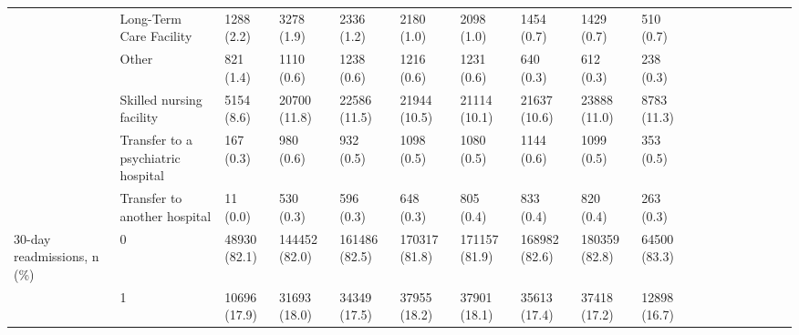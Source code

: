 \begin{tabular}{llllllllllllllllll}
                                       & Long-Term Care Facility &                   1288 (2.2) &      3278 (1.9) &      2336 (1.2) &      2180 (1.0) &      2098 (1.0) &      1454 (0.7) &      1429 (0.7) &      510 (0.7) &                   &                    &                    &                    &                    &                     &                     &                     \\
                                       & Other &                    821 (1.4) &      1110 (0.6) &      1238 (0.6) &      1216 (0.6) &      1231 (0.6) &       640 (0.3) &       612 (0.3) &      238 (0.3) &                   &                    &                    &                    &                    &                     &                     &                     \\
                                       & Skilled nursing facility &                   5154 (8.6) &    20700 (11.8) &    22586 (11.5) &    21944 (10.5) &    21114 (10.1) &    21637 (10.6) &    23888 (11.0) &    8783 (11.3) &                   &                    &                    &                    &                    &                     &                     &                     \\
                                       & Transfer to a psychiatric hospital &                    167 (0.3) &       980 (0.6) &       932 (0.5) &      1098 (0.5) &      1080 (0.5) &      1144 (0.6) &      1099 (0.5) &      353 (0.5) &                   &                    &                    &                    &                    &                     &                     &                     \\
                                       & Transfer to another hospital &                     11 (0.0) &       530 (0.3) &       596 (0.3) &       648 (0.3) &       805 (0.4) &       833 (0.4) &       820 (0.4) &      263 (0.3) &                   &                    &                    &                    &                    &                     &                     &                     \\
30-day readmissions, n (\%) & 0 &                 48930 (82.1) &   144452 (82.0) &   161486 (82.5) &   170317 (81.8) &   171157 (81.9) &   168982 (82.6) &   180359 (82.8) &   64500 (83.3) &                   &                    &                    &                    &                    &                     &                     &                     \\
                                       & 1 &                 10696 (17.9) &    31693 (18.0) &    34349 (17.5) &    37955 (18.2) &    37901 (18.1) &    35613 (17.4) &    37418 (17.2) &   12898 (16.7) &                   &                    &                    &                    &                    &                     &                     &                     \\

\end{tabular}
